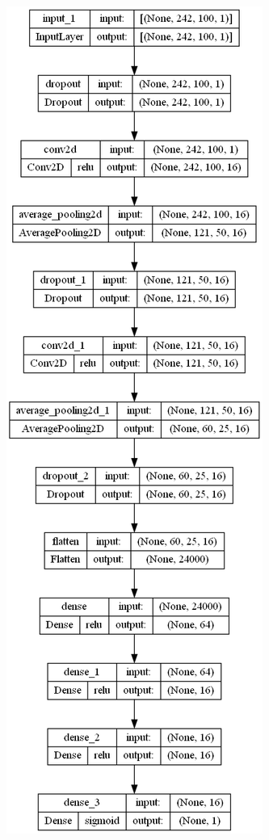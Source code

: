 \documentclass{article}
\begin{document}
\begin{figure}[!h]
    \centering\includegraphics[scale=.45]{./cnn-}
    \caption{}\label{fig.51}
\end{figure}
\end{document}
